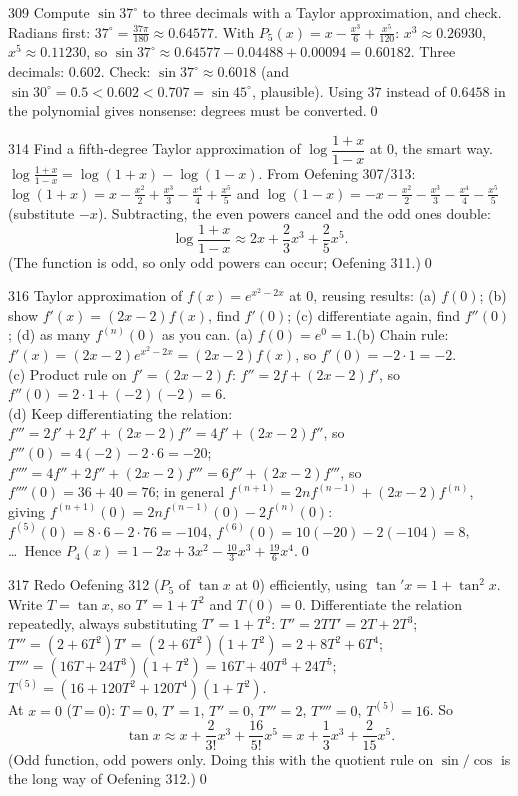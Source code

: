 \begin{bookex}{309}
Compute $\sin37^\circ$ to three decimals with a Taylor approximation, and check.
\solution
Radians first: $37^\circ=\frac{37\pi}{180}\approx0.64577$. With $P_5(x)=x-\frac{x^3}6+\frac{x^5}{120}$: $x^3\approx0.26930$, $x^5\approx0.11230$, so $\sin37^\circ\approx0.64577-0.04488+0.00094=0.60182$. Three decimals: $0.602$. Check: $\sin37^\circ\approx0.6018$ (and $\sin30^\circ=0.5<0.602<0.707=\sin45^\circ$, plausible). Using $37$ instead of $0.6458$ in the polynomial gives nonsense: degrees must be converted.\qed
\end{bookex}

\begin{bookex}{314}
Find a fifth-degree Taylor approximation of $\log\dfrac{1+x}{1-x}$ at $0$, the smart way.
\solution
$\log\frac{1+x}{1-x}=\log(1+x)-\log(1-x)$. From Oefening 307/313: $\log(1+x)=x-\frac{x^2}2+\frac{x^3}3-\frac{x^4}4+\frac{x^5}5$ and $\log(1-x)=-x-\frac{x^2}2-\frac{x^3}3-\frac{x^4}4-\frac{x^5}5$ (substitute $-x$). Subtracting, the even powers cancel and the odd ones double:
\[
\log\frac{1+x}{1-x}\approx2x+\frac23x^3+\frac25x^5 .
\]
(The function is odd, so only odd powers can occur; Oefening 311.)\qed
\end{bookex}

\begin{bookex}{316}
Taylor approximation of $f(x)=e^{x^2-2x}$ at $0$, reusing results: (a) $f(0)$; (b) show $f'(x)=(2x-2)f(x)$, find $f'(0)$; (c) differentiate again, find $f''(0)$; (d) as many $f^{(n)}(0)$ as you can.
\solution
(a) $f(0)=e^0=1$.\quad (b) Chain rule: $f'(x)=(2x-2)e^{x^2-2x}=(2x-2)f(x)$, so $f'(0)=-2\cdot1=-2$.\\
(c) Product rule on $f'=(2x-2)f$: $f''=2f+(2x-2)f'$, so $f''(0)=2\cdot1+(-2)(-2)=6$.\\
(d) Keep differentiating the relation: $f'''=2f'+2f'+(2x-2)f''=4f'+(2x-2)f''$, so $f'''(0)=4(-2)-2\cdot6=-20$; $f''''=4f''+2f''+(2x-2)f'''=6f''+(2x-2)f'''$, so $f''''(0)=36+40=76$; in general $f^{(n+1)}=2nf^{(n-1)}+(2x-2)f^{(n)}$, giving $f^{(n+1)}(0)=2nf^{(n-1)}(0)-2f^{(n)}(0)$: $f^{(5)}(0)=8\cdot6-2\cdot76=-104$, $f^{(6)}(0)=10(-20)-2(-104)=8$, \dots\ Hence $P_4(x)=1-2x+3x^2-\frac{10}3x^3+\frac{19}6x^4$.\qed
\end{bookex}

\begin{bookex}{317}
Redo Oefening 312 ($P_5$ of $\tan x$ at $0$) efficiently, using $\tan'x=1+\tan^2x$.
\solution
Write $T=\tan x$, so $T'=1+T^2$ and $T(0)=0$. Differentiate the relation repeatedly, always substituting $T'=1+T^2$:
$T''=2TT'=2T+2T^3$; $T'''=(2+6T^2)T'=(2+6T^2)(1+T^2)=2+8T^2+6T^4$; $T''''=(16T+24T^3)(1+T^2)=16T+40T^3+24T^5$; $T^{(5)}=(16+120T^2+120T^4)(1+T^2)$.\\
At $x=0$ ($T=0$): $T=0$, $T'=1$, $T''=0$, $T'''=2$, $T''''=0$, $T^{(5)}=16$. So
\[
\tan x\approx x+\frac2{3!}x^3+\frac{16}{5!}x^5=x+\frac13x^3+\frac2{15}x^5 .
\]
(Odd function, odd powers only. Doing this with the quotient rule on $\sin/\cos$ is the long way of Oefening 312.)\qed
\end{bookex}

